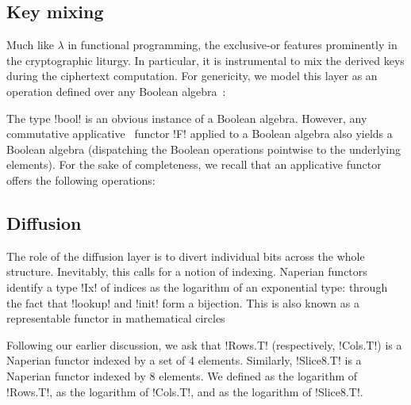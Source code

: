 \documentclass[draft,english]{jflart}
\begin{document}
\subsection{Key mixing}


Much like $\lambda$ in functional programming, the exclusive-or
features prominently in the cryptographic liturgy. In particular, it
is instrumental to mix the derived keys during the ciphertext
computation. For genericity, we model this layer as an operation
defined over any Boolean algebra~\citep{boolean-alg}:
%


The type \coqe!bool! is an obvious instance of a Boolean algebra.
However, any commutative applicative~\citep{applicative-functor,
  commutative-appfunc} functor \coqe!F! applied to a Boolean algebra
also yields a Boolean algebra (dispatching the Boolean operations
pointwise to the underlying elements). For the sake of completeness,
we recall that an applicative functor offers the following operations:
%


\subsection{Diffusion}


The role of the diffusion layer is to divert individual bits across the
whole structure. Inevitably, this calls for a notion of indexing.
Naperian functors~\citep{naperian} identify a type \coqe!Ix! of
indices as the logarithm of an exponential type:
%
%
through the fact that \coqe!lookup! and \coqe!init! form a bijection.
This is also known as a representable functor in mathematical
circles~\citep{mclane:working-categorist}


Following our earlier discussion, we ask that \coqe!Rows.T!
(respectively, \coqe!Cols.T!) is a Naperian functor indexed by a set
of 4 elements. Similarly, \coqe!Slice8.T! is a Naperian functor
indexed by 8 elements. We defined
%
%
as the logarithm of \coqe!Rows.T!,
%
%
as the logarithm of \coqe!Cols.T!, and
%
%
as the logarithm of \coqe!Slice8.T!.
\end{document}
